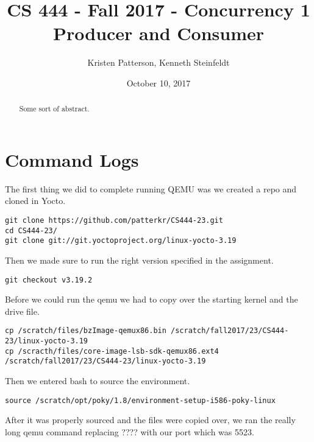 \documentclass[10pt,letterpaper,onecolumn,draftclsnofoot]{IEEEtran}
\begin{document}
\begin{titlepage}

	\title{CS 444 - Fall 2017 - Concurrency 1 \\ Producer and Consumer}
	\author{Kristen Patterson, Kenneth Steinfeldt}
	\date{October 10, 2017}
	\maketitle
	\vspace{4cm}
	\begin{abstract}
		\noindent 
			\noindent
		Some sort of abstract.
	\end{abstract}
\end{titlepage}

\section{Command Logs}
The first thing we did to complete running QEMU was we created a repo and cloned in Yocto.

\begin{lstlisting}
git clone https://github.com/patterkr/CS444-23.git
cd CS444-23/
git clone git://git.yoctoproject.org/linux-yocto-3.19
\end{lstlisting}

Then we made sure to run the right version specified in the assignment.

\begin{lstlisting}
git checkout v3.19.2
\end{lstlisting}

Before we could run the qemu we had to copy over the starting kernel and the
drive file.

\begin{lstlisting}
cp /scratch/files/bzImage-qemux86.bin /scratch/fall2017/23/CS444-23/linux-yocto-3.19
cp /scracth/files/core-image-lsb-sdk-qemux86.ext4 /scratch/fall2017/23/CS444-23/linux-yocto-3.19
\end{lstlisting}

Then we entered bash to source the environment.

\begin{lstlisting}
source /scratch/opt/poky/1.8/environment-setup-i586-poky-linux
\end{lstlisting}

After it was properly sourced and the files were copied over, we ran the really
long qemu command replacing ???? with our port which was 5523.
\end{document}
